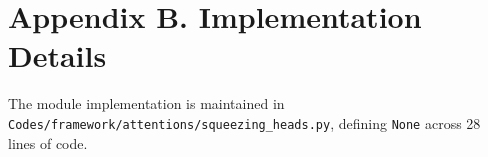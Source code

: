 \section*{Appendix B. Implementation Details}
The module implementation is maintained in \texttt{Codes/framework/attentions/squeezing\_heads.py}, defining \texttt{None} across 28 lines of code.
